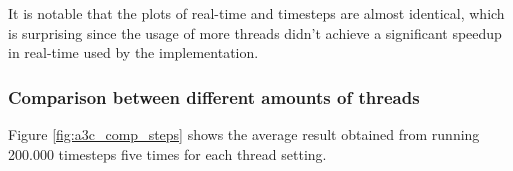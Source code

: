 \documentclass[11pt]{article}
\begin{document}
It is notable that the plots of real-time and timesteps are almost identical, which
is surprising since the usage of more threads didn't achieve a significant speedup
in real-time used by the implementation.




\subsubsection{Comparison between different amounts of threads}

Figure \ref{fig:a3c_comp_steps} shows the average result obtained from running 200.000
timesteps five times for each thread setting.
\end{document}
